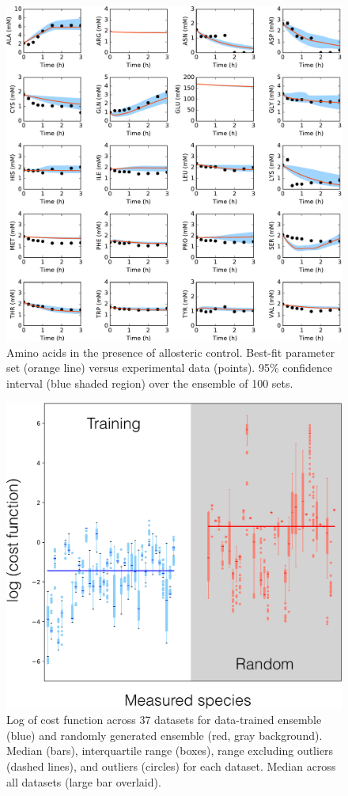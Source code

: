 \documentclass[12pt]{article}
\begin{document}
\begin{figure}[ht]
\centering
\includegraphics[width=1.00\textwidth]{./Figures/Fig_3_Amino.pdf}
\caption{Amino acids in the presence of allosteric control. Best-fit parameter set (orange line) versus experimental data (points). 95\% confidence interval (blue shaded region) over the ensemble of 100 sets.}
\label{fig:Amino}
\end{figure}

\begin{figure}[ht]
\centering
\includegraphics[width=1.00\textwidth]{./Figures/Fig_4_EnsembleVsRandom.pdf}
\caption{Log of cost function across 37 datasets for data-trained ensemble (blue) and randomly generated ensemble (red, gray background). Median (bars), interquartile range (boxes), range excluding outliers (dashed lines), and outliers (circles) for each dataset. Median across all datasets (large bar overlaid).}
\label{fig:BoxPlot}
\end{figure}
\end{document}
